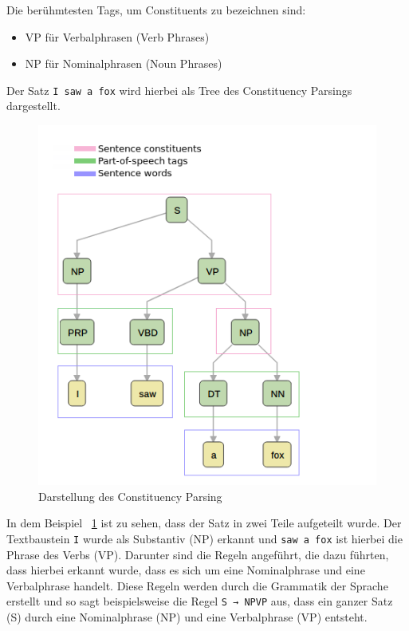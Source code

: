 Die berühmtesten Tags, um Constituents zu bezeichnen sind:

\begin{itemize}
    \item VP für Verbalphrasen (Verb Phrases)
    \item NP für Nominalphrasen (Noun Phrases)
\end{itemize}

Der Satz \texttt{I saw a fox} wird hierbei als Tree des Constituency Parsings dargestellt.

\begin{figure}[hbt!]
    \centering
    \includegraphics[scale=0.7]{pics/constituency_parse_tree}
    \caption{Darstellung des Constituency Parsing~\cite{dependencyVsConstituencyParsing}}
    \label{fig:constituency_parsing_tree}
\end{figure}

In dem Beispiel ~\ref{fig:constituency_parsing_tree} ist zu sehen, dass der Satz in zwei Teile aufgeteilt wurde.
Der Textbaustein \texttt{I} wurde als Substantiv (NP) erkannt und \texttt{saw a fox} ist hierbei die Phrase des Verbs (VP).
Darunter sind die Regeln angeführt, die dazu führten, dass hierbei erkannt wurde, dass es sich um eine Nominalphrase und eine Verbalphrase handelt.
Diese Regeln werden durch die Grammatik der Sprache erstellt und so sagt beispielsweise die Regel \texttt{S → NPVP} aus, dass ein ganzer Satz (S) durch eine Nominalphrase (NP) und eine Verbalphrase (VP) entsteht.\cite{dependencyVsConstituencyParsing}

